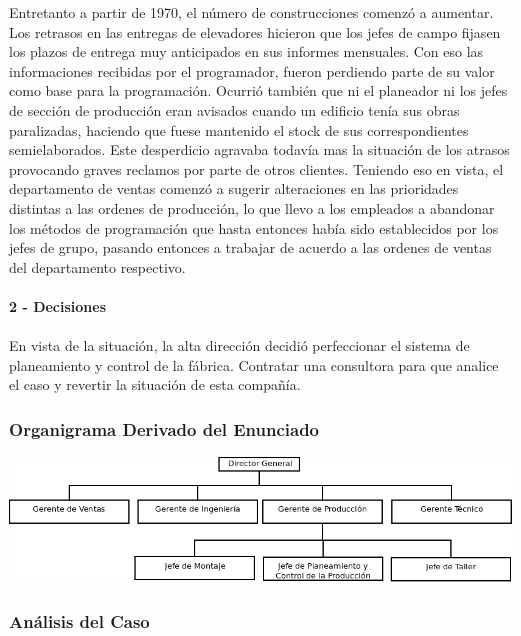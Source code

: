 \documentclass[a4paper,10pt,titlepage]{article}
\begin{document}
		\indent Entretanto a partir de 1970, el n\'umero de construcciones comenz\'o a aumentar. Los retrasos en las entregas de elevadores hicieron que los jefes de campo fijasen los plazos de entrega muy anticipados en sus informes mensuales. Con eso las informaciones recibidas por el programador, fueron perdiendo parte de su valor como base para la programaci\'on. Ocurri\'o tambi\'en que ni el planeador ni los jefes de secci\'on de producci\'on eran avisados cuando un edificio ten\'ia sus obras paralizadas, haciendo que fuese mantenido el stock de sus correspondientes semielaborados. Este desperdicio agravaba todav\'ia mas la situaci\'on de los atrasos provocando graves reclamos por parte de otros clientes. Teniendo eso en vista, el departamento de ventas comenz\'o a sugerir alteraciones en las prioridades distintas a las ordenes de producci\'on, lo que llevo a los empleados a abandonar los m\'etodos de programaci\'on que hasta entonces hab\'ia sido establecidos por los jefes de grupo, pasando entonces a trabajar de acuerdo a las ordenes de ventas del departamento respectivo.\\\\

	\textbf{2 - Decisiones}\\\\
		\indent En vista de la situaci\'on, la alta direcci\'on decidi\'o perfeccionar el sistema de planeamiento y control de la f\'abrica. Contratar una consultora para que analice el caso y revertir la situaci\'on de esta compa\~n\'ia.\\ 
\newpage
\subsubsection{Organigrama Derivado del Enunciado}
  \begin{center}
  \includegraphics[angle=90, scale=0.60]{./Organigramas/hercules1.png}
  \end{center}
\newpage

\subsubsection{An\'alisis del Caso}
\end{document}
